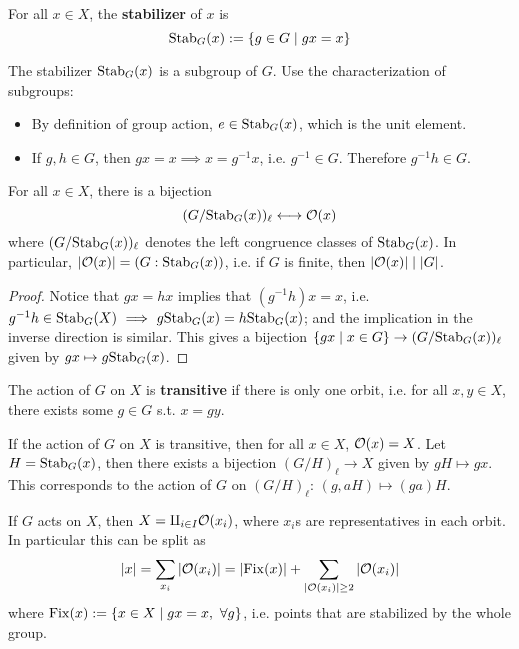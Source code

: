 \begin{definition}[Stabilizer]
    For all $x \in X$, the \textbf{stabilizer} of $x$ is
    \[
        \mathrm{Stab}_G(x) := \{g \in G \mid gx = x\}
    \]
\end{definition}

\begin{remark}
    The stabilizer $\mathrm{Stab}_G(x)$ is a subgroup of $G$. Use the characterization of subgroups:
    \begin{itemize}
        \item By definition of group action, $e \in \mathrm{Stab}_G(x)$, which is the unit element.
        \item If $g, h \in G$, then $gx = x \implies x = g^{-1}x$, i.e. $g^{-1} \in G$. Therefore $g^{-1}h \in G$. 
    \end{itemize}
\end{remark}

\begin{lemma}
    For all $x \in X$, there is a bijection
    \[
        (G / \mathrm{Stab}_G(x))_{\ell} \longleftrightarrow \mathcal{O}(x)
    \]
    where $(G / \mathrm{Stab}_G(x))_{\ell}$ denotes the left congruence classes of $\mathrm{Stab}_G(x)$. In particular, $\left|\mathcal{O}(x)\right| = (G : \mathrm{Stab}_G(x))$, i.e. if $G$ is finite, then $\left|\mathcal{O}(x)\right| \mid \left|G\right|$.
\end{lemma}

\begin{proof}
    Notice that $gx = hx$ implies that $(g^{-1}h)x = x$, i.e. $g^{-1}h \in \mathrm{Stab}_G(X) \ \Longrightarrow\  g \mathrm{Stab}_G(x) = h \mathrm{Stab}_G(x)$; and the implication in the inverse direction is similar. This gives a bijection $\{ gx \mid x \in G \} \to (G / \mathrm{Stab}_G(x))_{\ell}$ given by $gx \mapsto g \mathrm{Stab}_G(x)$.
\end{proof}

\begin{definition}[Transitive]
    The action of $G$ on $X$ is \textbf{transitive} if there is only one orbit, i.e. for all $x, y \in X$, there exists some $g \in G$ s.t. $x = gy$.
\end{definition}

\begin{corollary}
    If the action of $G$ on $X$ is transitive, then for all $x \in X$, $\mathcal{O}(x) = X$. Let $H = \mathrm{Stab}_G(x)$, then there exists a bijection $(G/H)_{\ell} \to X$ given by $gH \mapsto gx$. This corresponds to the action of $G$ on $(G/H)_{\ell}$: $(g, aH) \mapsto (ga)H$.
\end{corollary}

\begin{remark}
    If $G$ acts on $X$, then $X = \amalg_{i \in I} \mathcal{O}(x_i)$, where $x_i$s are representatives in each orbit. In particular this can be split as
    \[
        \left|x\right| = \sum_{x_i} \left|\mathcal{O}(x_i)\right| = \left|\mathrm{Fix}(x)\right| + \sum_{\left|\mathcal{O}(x_i)\right| \geq 2} \left|\mathcal{O}(x_i)\right|
    \]
    where $\mathrm{Fix}(x) := \{ x \in X \mid gx = x,\ \forall g \}$, i.e. points that are stabilized by the whole group.
\end{remark}


